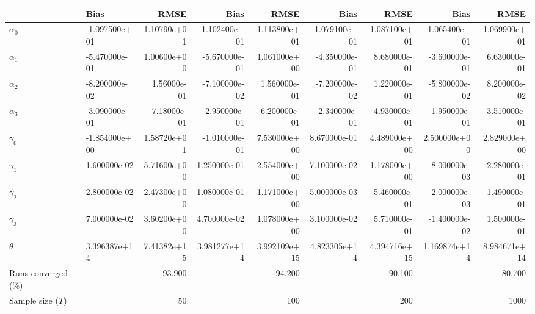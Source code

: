 
\begin{tabular}[t]{llrrrrrrr}
\toprule
  & Bias & RMSE & Bias & RMSE & Bias & RMSE & Bias & RMSE\\
\midrule
$\alpha_{0}$ & -1.097500e+01 & 1.10790e+01 & -1.102400e+01 & 1.113800e+01 & -1.079100e+01 & 1.087100e+01 & -1.065400e+01 & 1.069900e+01\\
$\alpha_{1}$ & -5.470000e-01 & 1.00600e+00 & -5.670000e-01 & 1.061000e+00 & -4.350000e-01 & 8.680000e-01 & -3.600000e-01 & 6.630000e-01\\
$\alpha_{2}$ & -8.200000e-02 & 1.56000e-01 & -7.100000e-02 & 1.560000e-01 & -7.200000e-02 & 1.220000e-01 & -5.800000e-02 & 8.200000e-02\\
$\alpha_{3}$ & -3.090000e-01 & 7.18000e-01 & -2.950000e-01 & 6.200000e-01 & -2.340000e-01 & 4.930000e-01 & -1.950000e-01 & 3.510000e-01\\
$\gamma_{0}$ & -1.854000e+00 & 1.58720e+01 & -1.010000e-01 & 7.530000e+00 & 8.670000e-01 & 4.489000e+00 & 2.500000e+00 & 2.829000e+00\\
$\gamma_{1}$ & 1.600000e-02 & 5.71600e+00 & 1.250000e-01 & 2.554000e+00 & 7.100000e-02 & 1.178000e+00 & -8.000000e-03 & 2.280000e-01\\
$\gamma_{2}$ & 2.800000e-02 & 2.47300e+00 & 1.080000e-01 & 1.171000e+00 & 5.000000e-03 & 5.460000e-01 & -2.000000e-03 & 1.490000e-01\\
$\gamma_{3}$ & 7.000000e-02 & 3.60200e+00 & 4.700000e-02 & 1.078000e+00 & 3.100000e-02 & 5.710000e-01 & -1.400000e-02 & 1.500000e-01\\
$\theta$ & 3.396387e+14 & 7.41382e+15 & 3.981277e+14 & 3.992109e+15 & 4.823305e+14 & 4.394716e+15 & 1.169874e+14 & 8.984671e+14\\
Runs converged (\%) &  & 93.900 &  & 94.200 &  & 90.100 &  & 80.700\\
Sample size ($T$) &  & 50 &  & 100 &  & 200 &  & 1000\\
\bottomrule
\end{tabular}

